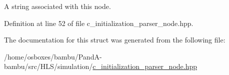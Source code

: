 A string associated with this node. 



Definition at line 52 of file c\+\_\+initialization\+\_\+parser\+\_\+node.\+hpp.



The documentation for this struct was generated from the following file\+:\begin{DoxyCompactItemize}
\item 
/home/osboxes/bambu/\+Pand\+A-\/bambu/src/\+H\+L\+S/simulation/\hyperlink{c__initialization__parser__node_8hpp}{c\+\_\+initialization\+\_\+parser\+\_\+node.\+hpp}\end{DoxyCompactItemize}
